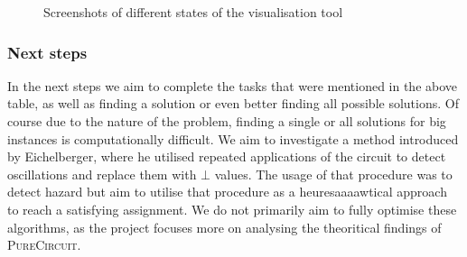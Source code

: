 \begin{figure}[h!]
    \centering
    \caption{Screenshots of different states of the visualisation tool}
    \label{fig:soft:current-phases}
\end{figure}
\subsubsection{Next steps}

In the next steps we aim to complete the tasks that were mentioned in the above table,
as well as finding a solution or even better finding all possible solutions. Of
course due to the nature of the problem, finding a single or all solutions for big instances
is computationally difficult. We aim to investigate a method introduced by Eichelberger, where
he utilised repeated applications of the circuit to detect oscillations and replace them with
$\bot$ values. The usage of that procedure was to detect hazard but aim to utilise that procedure
as a heuresaaaawtical approach to reach a satisfying assignment. We do not primarily aim
to fully optimise these algorithms, as the project focuses more on analysing the theoritical findings
of \textsc{PureCircuit}.





